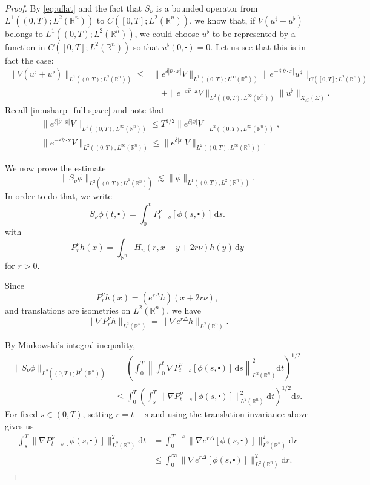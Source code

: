 \documentclass[10pt,a4paper]{amsart}
\theoremstyle{remark}
\theoremstyle{definition}
\newcommand{\R}{\mathbb{R}}
\newcommand{\dd}{\mathrm{d}}
\newcommand{\x}{\mathrm{x}}
\begin{document}
\begin{proof}
By \eqref{eq:uflat} and the fact that $S_\nu$ is a 
bounded operator from $L^1((0, T); L^2(\R^n))$ to 
$C([0, T]; L^2(\R^n))$, we know that, if $V(u^\sharp + u^\flat)$ belongs to 
$L^1((0, T); L^2(\R^n))$, we could choose
$u^\flat$ to be represented by a function in $C([0, T]; L^2(\R^n))$ so that
$u^\flat(0,\centerdot) = 0$.
Let us see that this is in fact the case:
\begin{align*}
\| V(u^\sharp + u^\flat) \|_{L^1((0,T); L^2(\R^n))} \leq & \| e^{\delta |\hat \nu \cdot x|} V \|_{L^1((0,T); L^\infty(\R^n))} \| e^{-\delta |\hat \nu \cdot x|} u^\sharp \|_{C([0, T]; L^2(\R^n))}\\
& \quad + \| e^{- \varepsilon \hat{\nu} \cdot \x} V \|_{L^2((0,T); L^\infty(\R^n))} \| u^\flat \|_{X_{\varepsilon \hat \nu} (\Sigma)}.
\end{align*}
Recall \eqref{in:usharp_full-space} and note that
\begin{align*}
& \| e^{\delta |\hat \nu \cdot x|} V \|_{L^1((0,T); L^\infty(\R^n))} \leq T^{1/2} \| e^{\delta |x|} V \|_{L^2((0,T); L^\infty(\R^n))}, \\
& \| e^{- \varepsilon \hat{\nu} \cdot \x} V \|_{L^2((0,T); L^\infty(\R^n))} \leq \| e^{\delta |x|} V \|_{L^2((0,T); L^\infty(\R^n))}.
\end{align*}

We now prove the estimate
\[
    \|S_\nu\phi\|_{L^2((0,T);\dot H^1(\mathbb R^n))}
    \lesssim
    \|\phi\|_{L^1((0,T);L^2(\mathbb R^n))}.
\]
In order to do that, we write
\[
    S_\nu\phi(t, \centerdot)
    =
    \int_0^t P_{t-s}^\nu[\phi(s, \centerdot)]\, \dd s.
\]
with
\[
    P_r^\nu h(x)
    =
    \int_{\mathbb R^n}
    H_n(r,x-y+2r\nu)h(y)\,\dd y
\]
for $r>0$.

Since
\[
    P_r^\nu h(x)
    =
    (e^{r\Delta}h)(x+2r\nu),
\]
and translations are isometries on $L^2(\mathbb R^n)$, we have
\[
    \|\nabla P_r^\nu h\|_{L^2(\mathbb R^n)}
    =
    \|\nabla e^{r\Delta}h\|_{L^2(\mathbb R^n)}.
\]

By Minkowski's integral inequality,
\begin{align*}
    \|S_\nu\phi\|_{L^2((0,T);\dot H^1(\mathbb R^n))}
    &=
    \left(
        \int_0^T
        \left\|
            \int_0^t
            \nabla P_{t-s}^\nu[\phi(s, \centerdot)]\, \dd s
        \right\|_{L^2(\mathbb R^n)}^2
        \dd t
    \right)^{1/2}
    \\
    &\le
    \int_0^T
    \left(
        \int_s^T
        \|\nabla P_{t-s}^\nu[\phi(s, \centerdot)]\|_{L^2(\mathbb R^n)}^2
        \dd t
    \right)^{1/2}
    \dd s.
\end{align*}
For fixed $s\in(0,T)$, setting $r=t-s$ and using the
translation invariance above gives us
\begin{align*}
    \int_s^T
    \|\nabla P_{t-s}^\nu[\phi(s, \centerdot)]\|_{L^2(\mathbb R^n)}^2
    \dd t
    &=
    \int_0^{T-s}
    \|\nabla e^{r\Delta}[\phi(s, \centerdot)]\|_{L^2(\mathbb R^n)}^2
    \dd r
    \\
    &\le
    \int_0^\infty
    \|\nabla e^{r\Delta}[\phi(s, \centerdot)]\|_{L^2(\mathbb R^n)}^2
    \dd r.
\end{align*}


\end{proof}
\end{document}
